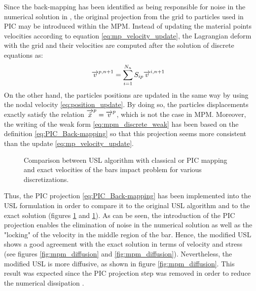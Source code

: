 Since the back-mapping has been identified as being responsible for noise in the numerical solution in \cite{Mass_Flip}, the original projection from the grid to particles used in PIC may be introduced within the MPM. Instead of updating the material points velocities according to equation \eqref{eq:mp_velocity_update}, the Lagrangian deform with the grid and their velocities are computed after the solution of discrete equations as:
\begin{equation}
  \label{eq:PIC_Back-mapping}
  {\overrightarrow{v}}^{p,n+1}=\sum_{i=1}^{N_n} S_{ip}{\overrightarrow{v}}^{i,n+1}
\end{equation}
On the other hand, the particles positions are updated in the same way by using the nodal velocity \eqref{eq:position_update}. By doing so, the particles displacements exactly satisfy the relation ${\overrightarrow{\dot{x}}}^p={\overrightarrow{v}}^p$, which is not the case in MPM. Moreover, the writing of the weak form \eqref{eq:mpm_discrete_weak} has been based on the definition \eqref{eq:PIC_Back-mapping} so that this projection seems more consistent than the update \eqref{eq:mp_velocity_update}. 
\begin{figure}[h!]
  \centering
  { \label{subfig:MPM_velo_10}}
  { \label{subfig:MPM_velo_25}}
  \caption{Comparison between USL algorithm with classical or PIC mapping and exact velocities of the bars impact problem for various discretizations.}
  \label{fig:MPM_velocities}
\end{figure}
Thus, the PIC projection \eqref{eq:PIC_Back-mapping} has been implemented into the USL formulation in order to compare it to the original USL algorithm and to the exact solution (figures \ref{fig:MPM_velocities} and \ref{fig:MPM_velocities}). As can be seen, the introduction of the PIC projection enables the elimination of noise in the numerical solution as well as the "locking" of the velocity in the middle region of the bar. Hence, the modified USL shows a good agreement with the exact solution in terms of velocity and stress (see figures \ref{fig:mpm_diffusion} and \ref{fig:mpm_diffusion}). Nevertheless, the modified USL is more diffusive, as shown in figure \ref{fig:mpm_diffusion}. This result was expected since the PIC projection step was removed in order to reduce the numerical dissipation \cite{PIC_Nishiguchi}. 
